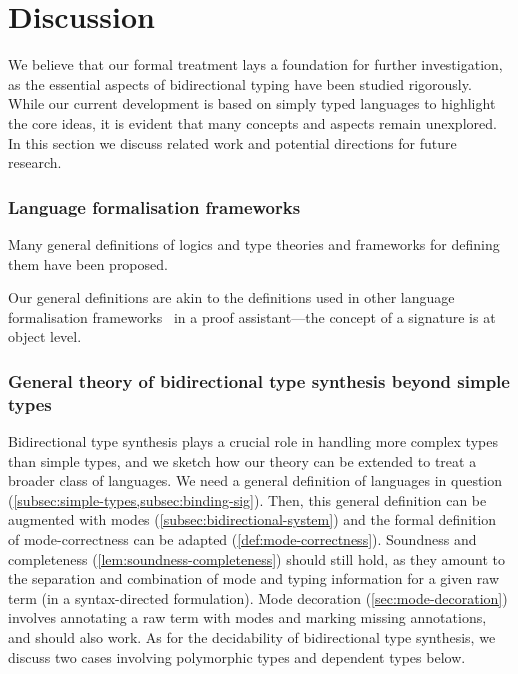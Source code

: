 
\section{Discussion} \label{sec:future}
We believe that our formal treatment lays a foundation for further investigation, as the essential aspects of bidirectional typing have been studied rigorously. 
While our current development is based on simply typed languages to highlight the core ideas, it is evident that many concepts and aspects remain unexplored.
In this section we discuss related work and potential directions for future research.
\subsubsection{Language formalisation frameworks}
Many general definitions of logics and type theories and frameworks for defining them have been proposed.

\citet{Harper1993a,Harper2007}
\cite{Uemura2021}
\cite{Bauer2020,Haselwarter2021,Bauer2022a}
Our general definitions are akin to the definitions used in other language formalisation frameworks~\citep{Ahrens2022,Allais2021,Fiore2022} in a proof assistant---the concept of a signature is at object level.

\subsubsection{General theory of bidirectional type synthesis beyond simple types}

Bidirectional type synthesis plays a crucial role in handling more complex types than simple types, and we sketch how our theory can be extended to treat a broader class of languages.
We need a general definition of languages in question (\cref{subsec:simple-types,subsec:binding-sig}).
Then, this general definition can be augmented with modes (\cref{subsec:bidirectional-system}) and the formal definition of mode-correctness can be adapted (\cref{def:mode-correctness}).
Soundness and completeness (\cref{lem:soundness-completeness}) should still hold, as they amount to the separation and combination of mode and typing information for a given raw term (in a syntax-directed formulation).
Mode decoration (\cref{sec:mode-decoration}) involves annotating a raw term with modes and marking missing annotations, and should also work.
As for the decidability of bidirectional type synthesis, we discuss two cases involving polymorphic types and dependent types below.

